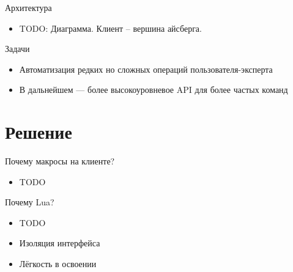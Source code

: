 \documentclass[handout]{beamer}
\begin{document}

\begin{frame}{Архитектура}

\begin{itemize}
\item TODO: Диаграмма. Клиент -- вершина айсберга.
\end{itemize}

\end{frame}


\begin{frame}{Задачи}

\begin{itemize}
\item Автоматизация редких но сложных операций пользователя-эксперта
\item В дальнейшем --- более высокоуровневое API для более частых команд
\end{itemize}

\end{frame}


\section{Решение}


\begin{frame}{Почему макросы на клиенте?}

\begin{itemize}
\item TODO
\end{itemize}

\end{frame}


\begin{frame}{Почему Lua?}

\begin{itemize}
\item TODO
\item Изоляция интерфейса
\item Лёгкость в освоении
\end{itemize}

\end{frame}
\end{document}
